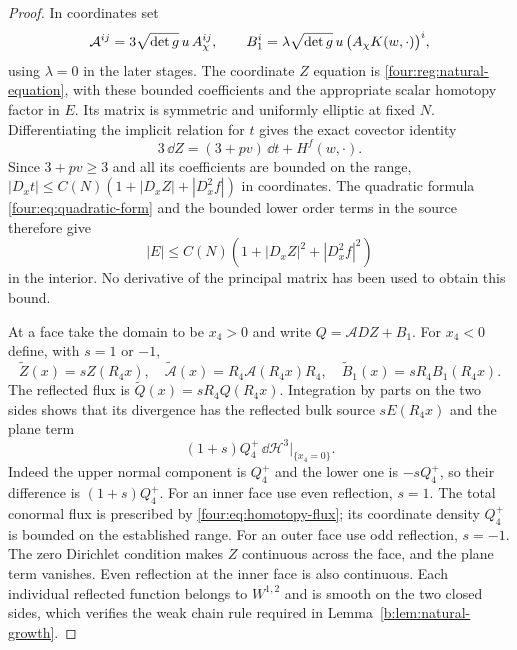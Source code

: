 \begin{proof}
In coordinates set
\[
 \mathcal A^{ij}=3\sqrt{\det g}\,u\,A_\chi^{ij},\qquad
 B_1^i=\lambda\sqrt{\det g}\,u\,
                     \bigl(A_\chi K(w,\cdot)\bigr)^i,
\]
using $\lambda=0$ in the later stages.  The coordinate $Z$ equation
is \eqref{four:reg:natural-equation}, with these bounded coefficients
and the appropriate scalar homotopy factor in $E$.  Its matrix
is symmetric and uniformly elliptic at fixed $N$.
Differentiating the implicit relation for $t$ gives the exact
covector identity
\begin{equation}\label{four:reg:t-differential}
 3\,\dd Z=(3+pv)\,\dd t+H^f(w,\cdot).
\end{equation}
Since $3+pv\ge3$ and all its coefficients are bounded on the range,
$|D_xt|\le C(N)(1+|D_xZ|+|D_x^2f|)$ in coordinates.
The quadratic formula \eqref{four:eq:quadratic-form} and the bounded
lower order terms in the source therefore give
\begin{equation}\label{four:reg:coupled-source}
 |E|\le C(N)(1+|D_xZ|^2+|D_x^2f|^2)
\end{equation}
in the interior.  No derivative of the principal matrix has been
used to obtain this bound.

At a face take the domain to be $x_4>0$ and write
$Q=\mathcal A DZ+B_1$.  For $x_4<0$ define, with $s=1$ or $-1$,
\[
 \widetilde Z(x)=sZ(R_4x),\quad
 \widetilde{\mathcal A}(x)=R_4\mathcal A(R_4x)R_4,\quad
 \widetilde B_1(x)=sR_4B_1(R_4x).
\]
The reflected flux is $\widetilde Q(x)=sR_4Q(R_4x)$.
Integration by parts on the two sides shows that its divergence
has the reflected bulk source $sE(R_4x)$ and the plane term
\begin{equation}\label{four:reg:reflection-measure}
 (1+s)Q_4^+\,\dd\mathcal H^3|_{\{x_4=0\}}.
\end{equation}
Indeed the upper normal component is $Q_4^+$ and the lower one is
$-sQ_4^+$, so their difference is $(1+s)Q_4^+$.
For an inner face use even reflection, $s=1$.  The total conormal
flux is prescribed by \eqref{four:eq:homotopy-flux}; its coordinate
density $Q_4^+$ is bounded on the established range.  For an outer
face use odd reflection, $s=-1$.  The zero Dirichlet condition
makes $Z$ continuous across the face, and the plane term vanishes.
Even reflection at the inner face is also continuous.  Each
individual reflected function belongs to $W^{1,2}$ and is smooth
on the two closed sides, which verifies the weak chain rule
required in Lemma~\ref{b:lem:natural-growth}.


\end{proof}

